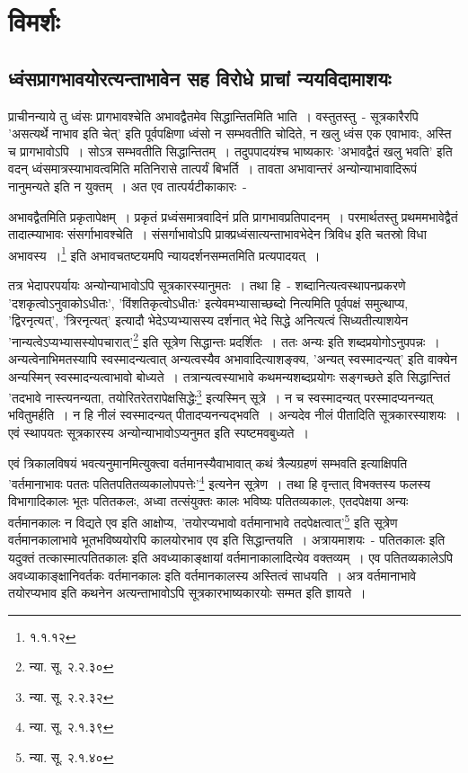 	\section{विमर्शः}

		\subsection{ध्वंसप्रागभावयोरत्यन्ताभावेन सह विरोधे प्राचां न्ययविदामाशयः}

		प्राचीनन्याये तु ध्वंसः प्रागभावश्चेति अभावद्वैतमेव सिद्धान्तितमिति भाति~। वस्तुतस्तु~- सूत्रकारैरपि 'असत्यर्थे नाभाव इति चेत्' इति पूर्वपक्षिणा ध्वंसो न सम्भवतीति चोदिते, न खलु ध्वंस एक एवाभावः, अस्ति च प्रागभावोऽपि~। सोऽत्र सम्भवतीति सिद्धान्तितम्~। तदुपपादयंश्च भाष्यकारः 'अभावद्वैतं खलु भवति' इति वदन् ध्वंसमात्रस्याभावत्वमिति मतिनिरासे तात्पर्यं बिभर्ति~। तावता अभावान्तरं अन्योन्याभावादिरूपं नानुमन्यते इति न युक्तम्~। अत एव तात्पर्यटीकाकारः~-

		{\fontsize{11.7}{0}\selectfont\s अभावद्वैतमिति प्रकृतापेक्षम्~। प्रकृतं प्रध्वंसमात्रवादिनं प्रति प्रागभावप्रतिपादनम्~। परमार्थतस्तु प्रथममभावेद्वैतं तादात्म्याभावः संसर्गाभावश्चेति~। संसर्गाभावोऽपि प्राक्प्रध्वंसात्यन्ताभावभेदेन त्रिविध इति चतस्रो विधा अभावस्य~।\footnote{१.१.१२}} इति अभावचतष्टयमपि न्यायदर्शनसम्मतमिति प्रत्यपादयत्~। 

		तत्र भेदापरपर्यायः अन्योन्याभावोऽपि सूत्रकारस्यानुमतः~। तथा हि~- शब्दानित्यत्वस्थापनप्रकरणे 'दशकृत्वोऽनुवाकोऽधीतः', 'विंशतिकृत्वोऽधीतः' इत्येवमभ्यासाच्छब्दो नित्यमिति पूर्वपक्षं समुत्थाप्य, 'द्विरनृत्यत्', 'त्रिरनृत्यत्' इत्यादौ भेदेऽप्यभ्यासस्य दर्शनात् भेदे सिद्धे अनित्यत्वं सिध्यतीत्याशयेन 'नान्यत्वेऽप्यभ्यासस्योपचारात्'\footnote{न्या. सू. २.२.३०} इति सूत्रेण सिद्धान्तः प्रदर्शितः~। ततः अन्यः इति शब्दप्रयोगोऽनुपपन्नः~। अन्यत्वेनाभिमतस्यापि स्वस्मादन्यत्वात् अन्यत्वस्यैव अभावादित्याशङ्क्य, 'अन्यत् स्वस्मादन्यत्' इति वाक्येन अन्यस्मिन् स्वस्मादन्यत्वाभावो बोध्यते~। तत्रान्यत्वस्याभावे कथमन्यशब्दप्रयोगः सङ्गच्छते इति सिद्धान्तितं 'तदभावे नास्त्यनन्यता, तयोरितरेतरापेक्षसिद्धेः\footnote{न्या. सू. २.२.३२} इत्यस्मिन् सूत्रे~। न च स्वस्मादन्यत् परस्मादप्यनन्यत् भवितुमर्हति~। न हि नीलं स्वस्मादन्यत् पीतादप्यनन्यद्भवति~। अन्यदेव नीलं पीतादिति सूत्रकारस्याशयः~। एवं स्थापयतः सूत्रकारस्य अन्योन्याभावोऽप्यनुमत इति स्पष्टमवबुध्यते~।

		एवं त्रिकालविषयं भवत्यनुमानमित्युक्त्वा वर्तमानस्यैवाभावात् कथं त्रैल्यग्रहणं सम्भवति इत्याक्षिपति 'वर्तमानाभावः पततः पतितपतितव्यकालोपपत्तेः'\footnote{न्या. सू. २.१.३९} इत्यनेन सूत्रेण~। तथा हि वृन्तात् विभक्तस्य फलस्य विभागादिकालः भूतः पतितकलः, अध्वा तत्संयुक्तः कालः भविष्यः पतितव्यकालः, एतदपेक्षया अन्यः वर्तमानकालः न विद्यते एव इति आक्षोप्य, 'तयोरप्यभावो वर्तमानाभावे तदपेक्षत्वात्'\footnote{न्या. सू. २.१.४०} इति सूत्रेण वर्तमानकालाभावे भूतभविष्ययोरपि कालयोरभाव एव इति सिद्धान्तयति~। अत्रायमाशयः~- पतितकालः इति यदुक्तं तत्कास्मात्पतितकालः इति अवध्याकाङ्क्षायां वर्तमानाकालादित्येव वक्तव्यम्~। एव पतितव्यकालेऽपि अवध्याकाङ्क्षानिवर्तकः वर्तमानकालः इति वर्तमानकालस्य अस्तित्वं साधयति~। अत्र वर्तमानाभावे तयोरप्यभाव इति कथनेन अत्यन्ताभावोऽपि सूत्रकारभाष्यकारयोः सम्मत इति ज्ञायते~।

